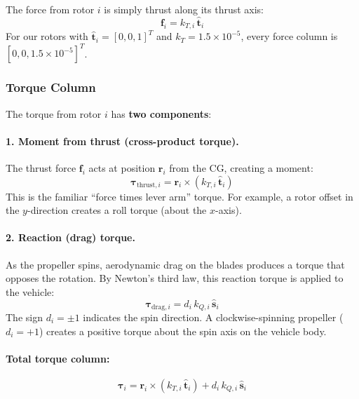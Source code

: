 \documentclass[12pt, a4paper]{article}
\newcommand{\btau}{\bm{\tau}}
\begin{document}
The force from rotor $i$ is simply thrust along its thrust axis:
\begin{equation}
    \bm{f}_i = k_{T,i} \, \hat{\bm{t}}_i
\end{equation}
For our rotors with $\hat{\bm{t}}_i = [0, 0, 1]^T$ and $k_T = 1.5 \times 10^{-5}$, every force column is $[0, 0, 1.5 \times 10^{-5}]^T$.

\subsubsection{Torque Column}

The torque from rotor $i$ has \textbf{two components}:

\paragraph{1. Moment from thrust (cross-product torque).}  The thrust force $\bm{f}_i$ acts at position $\bm{r}_i$ from the CG, creating a moment:
\begin{equation}
    \btau_{\text{thrust},i} = \bm{r}_i \times (k_{T,i} \, \hat{\bm{t}}_i)
\end{equation}
This is the familiar ``force times lever arm'' torque.  For example, a rotor offset in the $y$-direction creates a roll torque (about the $x$-axis).

\paragraph{2. Reaction (drag) torque.}  As the propeller spins, aerodynamic drag on the blades produces a torque that opposes the rotation.  By Newton's third law, this reaction torque is applied to the vehicle:
\begin{equation}
    \btau_{\text{drag},i} = d_i \, k_{Q,i} \, \hat{\bm{s}}_i
\end{equation}
The sign $d_i = \pm 1$ indicates the spin direction.  A clockwise-spinning propeller ($d_i = +1$) creates a positive torque about the spin axis on the vehicle body.

\paragraph{Total torque column:}
\begin{equation}
    \btau_i = \bm{r}_i \times (k_{T,i} \, \hat{\bm{t}}_i) + d_i \, k_{Q,i} \, \hat{\bm{s}}_i
    \label{eq:torque_col}
\end{equation}
\end{document}
